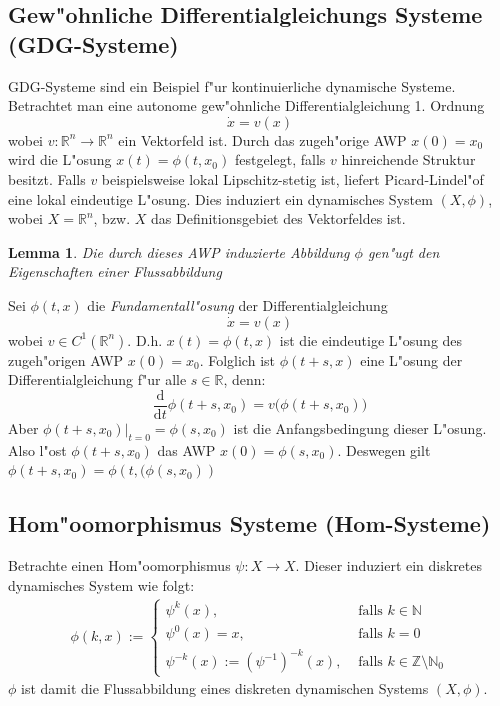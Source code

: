 \documentclass[a4paper, 13pt]{scrreprt}
\newtheorem{lemma}[theorem]{Lemma}
\theoremstyle{definition} \newtheorem{definition}{Definition}[section]
\newenvironment{beweis}[1][Beweis]{\begin{trivlist}
\item[\hskip \labelsep {\bfseries #1}]}{\end{trivlist}}
\begin{document}
\subsection{Gew"ohnliche Differentialgleichungs Systeme (GDG-Systeme)}
GDG-Systeme sind ein Beispiel f"ur kontinuierliche dynamische Systeme. Betrachtet man eine autonome gew"ohnliche Differentialgleichung 1. Ordnung
$$\dot x= v(x)$$
wobei $v\colon\mathbb{R}^n\to\mathbb{R}^n$ ein Vektorfeld ist. Durch das zugeh"orige AWP $x(0) = x_0$ wird die L"osung $x(t) = \phi(t, x_0)$ festgelegt, falls $v$ hinreichende Struktur besitzt. Falls $v$ beispielsweise lokal Lipschitz-stetig ist, liefert Picard-Lindel"of eine lokal eindeutige L"osung. 
Dies induziert ein dynamisches System $(X, \phi)$, wobei $X = \mathbb{R}^n$, bzw. $X$ das Definitionsgebiet des Vektorfeldes ist.
\begin{lemma}
Die durch dieses AWP induzierte Abbildung $\phi$ gen"ugt den Eigenschaften einer Flussabbildung
\end{lemma}
\begin{beweis}
Sei $\phi(t, x)$ die \emph{Fundamentall"osung} der Differentialgleichung
$$\dot x = v(x)$$
wobei $v\in C^1(\mathbb{R}^n)$. D.h. $x(t) = \phi(t,x)$ ist die eindeutige L"osung des zugeh"origen AWP $x(0) = x_0$.
Folglich ist $\phi(t+s, x)$ eine L"osung der Differentialgleichung f"ur alle $s\in \mathbb{R}$, denn:
$$\frac{\mathrm d}{\mathrm dt} \phi(t+s, x_0) = v\bigl(\phi(t+s, x_0)\bigr)$$
Aber $\left . \phi(t+s, x_0) \right |_{t=0} = \phi(s, x_0)$ ist die Anfangsbedingung dieser L"osung. Also l"ost $\phi(t+s, x_0)$ das AWP $x(0) = \phi(s, x_0)$.
Deswegen gilt $\phi(t+s, x_0) = \phi\left(t, (\phi(s, x_0)\right)$
\end{beweis}

\subsection{Hom"oomorphismus Systeme (Hom-Systeme)}
Betrachte einen Hom"oomorphismus $\psi\colon X \to X$. Dieser induziert ein diskretes dynamisches System wie folgt:
\begin{align*}
\phi(k, x) := \begin{cases}
\psi^k(x), &\mbox{ falls } k \in \mathbb{N} \\
\psi^0(x) = x,& \mbox{ falls } k = 0 \\
\psi^{-k}(x) := (\psi^{-1})^{-k}(x), &\mbox{ falls } k \in \mathbb{Z}\setminus\mathbb{N}_0
\end{cases}
\end{align*}
$\phi$ ist damit die Flussabbildung eines diskreten dynamischen Systems $(X, \phi)$.
\end{document}
